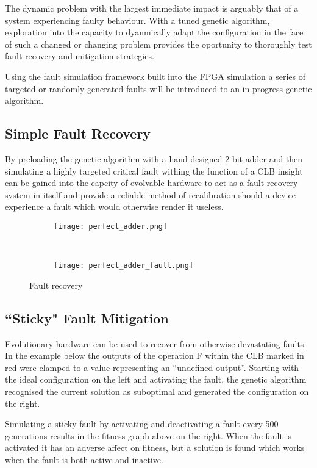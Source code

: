 The dynamic problem with the largest immediate impact is arguably that of
a system experiencing faulty behaviour.
With a tuned genetic algorithm, exploration into the capacity to dyanmically
adapt the configuration in the face of such a changed or changing problem provides
the oportunity to thoroughly test fault recovery and mitigation strategies.

Using the fault simulation framework built into the FPGA simulation a series
of targeted or randomly generated faults will be introduced to an in-progress
genetic algorithm.

\subsection{Simple Fault Recovery}
By preloading the genetic algorithm with a hand designed 2-bit adder and then
simulating a highly targeted critical fault withing the function of a CLB insight
can be gained into the capcity of evolvable hardware to act as a fault recovery
system in itself and provide a reliable method of recalibration should a device
experience a fault which would otherwise render it useless.

\begin{figure}
	\centering
	\begin{subfigure}[ht]{0.45\textwidth}
		\texttt{[image: perfect\_adder.png]}
	\end{subfigure}
	~
	\begin{subfigure}[ht]{0.45\textwidth}
		\texttt{[image: perfect\_adder\_fault.png]}
	\end{subfigure}
	\caption{Fault recovery}
\end{figure}

\subsection{``Sticky" Fault Mitigation}
Evolutionary hardware can be used to recover from otherwise devastating faults. In the example below the outputs of the operation F within the CLB marked in red were clamped to a value representing an “undefined output”. Starting with the ideal configuration on the left and activating the fault, the genetic algorithm recognised the current solution as suboptimal and generated the configuration on the right.

Simulating a sticky fault by activating and deactivating a fault every 500 generations results in the fitness graph above on the right. When the fault is activated it has an adverse affect on fitness, but a solution is found which works when the fault is both active and inactive.

